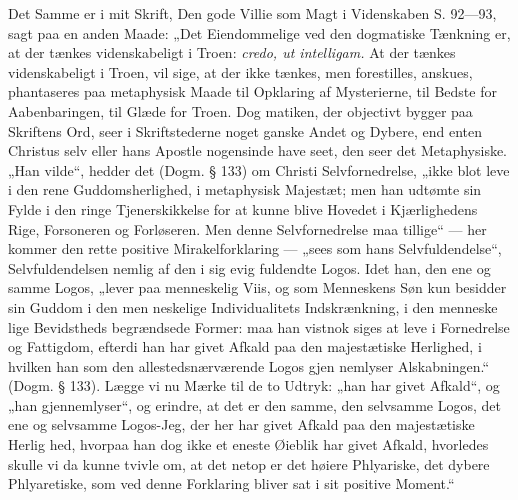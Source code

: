 \documentclass[12pt]{book}
\newcommand{\opage}[1]{\marginnote{\footnotesize\textit{[#1]}}}
\begin{document}
Det Samme er i mit Skrift, Den gode Villie som
Magt i Videnskaben S. 92---93, sagt paa en anden Maade:
„Det Eiendommelige ved den dogmatiske Tænkning er,
at der tænkes videnskabeligt i Troen: \textit{credo, ut intelligam.}
At der tænkes videnskabeligt i Troen, vil sige, at der
ikke tænkes, men forestilles, anskues, phantaseres paa
\opage{242}\setcounter{footnote}{0}%
metaphysisk Maade til Opklaring af Mysterierne, til
Bedste for Aabenbaringen, til Glæde for Troen. Dog\-%
matiken, der objectivt bygger paa Skriftens Ord, seer i
Skriftstederne noget ganske Andet og Dybere, end enten
Christus selv eller hans Apostle nogensinde have seet,
den seer det Metaphysiske. „Han vilde“, hedder det
(Dogm. § 133) om Christi Selvfornedrelse, „ikke blot
leve i den rene Guddomsherlighed, i metaphysisk Majestæt;
men han udtømte sin Fylde i den ringe Tjenerskikkelse
for at kunne blive Hovedet i Kjærlighedens Rige, Forsoneren
og Forløseren. Men denne Selvfornedrelse maa tillige“
--- her kommer den rette positive Mirakelforklaring ---
„sees som hans Selvfuldendelse“, Selvfuldendelsen nemlig af
den i sig evig fuldendte Logos. Idet han, den ene og
samme Logos, „lever paa menneskelig Viis, og som
Menneskens Søn kun besidder sin Guddom i den men\-%
neskelige Individualitets Indskrænkning, i den menneske\-%
lige Bevidstheds begrændsede Former: maa han vistnok
siges at leve i Fornedrelse og Fattigdom, efterdi han
har givet Afkald paa den majestætiske Herlighed, i
hvilken han som den allestedsnærværende Logos gjen\-%
nemlyser Alskabningen.“ (Dogm. § 133). Lægge vi
nu Mærke til de to Udtryk: „han har givet Afkald“, og
„han gjennemlyser“, og erindre, at det er den samme,
den selvsamme Logos, det ene og selvsamme Logos-Jeg,
der her har givet Afkald paa den majestætiske Herlig\-%
hed, hvorpaa han dog ikke et eneste Øieblik har givet
Afkald, hvorledes skulle vi da kunne tvivle om, at det
netop er det høiere Phlyariske, det dybere Phlyaretiske,
som ved denne Forklaring bliver sat i sit positive
Moment.“
\end{document}
